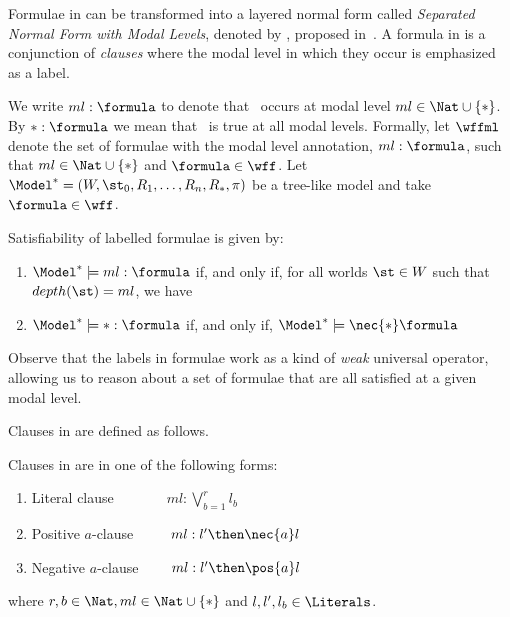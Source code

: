 Formulae in  can be transformed into a layered normal form called
\emph{Separated Normal Form with Modal Levels}, denoted by
, proposed in~\cite{journals/jal/NalonD07}. A formula in  is a
conjunction of \emph{clauses} where the modal level in which they occur is
emphasized as a label.

We write $ml: \formula$ to denote that \formula~occurs at modal level $ml\in
\Nat \cup \{*\}$. By $*: \formula$ we mean that \formula~is true at
all modal levels. Formally, let $\wffml$ denote the set of formulae with
the modal level annotation, $ml : \formula$, such that $ml \in \Nat \cup \{*\}$
and $\formula \in \wff$. Let $\Model^* = (W, \st_0, R_1, \ldots, R_n, R_*, \pi)$
be a tree-like model and take $\formula \in \wff$. 

\begin{definition}
Satisfiability of labelled formulae is given by:

\begin{enumerate}
    \item $\Model^* \models ml : \formula$ if, and only if, for all worlds
        $\st \in W$ such that $depth(\st) = ml$, we have
        \sat{\Model^*}{\st}{\formula} 
    \item $\Model^* \models * : \formula$ if, and only if, $\Model^* \models
        \nec{*} \formula$
\end{enumerate}
    
\end{definition}

Observe that the labels in formulae work as a kind of \textit{weak} universal
operator, allowing us to reason about a set of formulae that are all satisfied
at a given modal level.

Clauses in  are defined as follows.

\begin{definition}
    Clauses in  are in one of the following forms:
    \begin{enumerate}
        \item Literal clause $\ \ \quad \qquad ml : \bigvee^r_{b=1} l_b$
        \item Positive $a$-clause $\ \qquad ml : l' \then \nec{a} l$
        \item Negative $a$-clause $\qquad ml : l' \then \pos{a} l$
    \end{enumerate}
    where $r, b \in \Nat, ml \in \Nat \cup \{*\}$ and $l, l', l_b \in
    \Literals$.
\end{definition}

